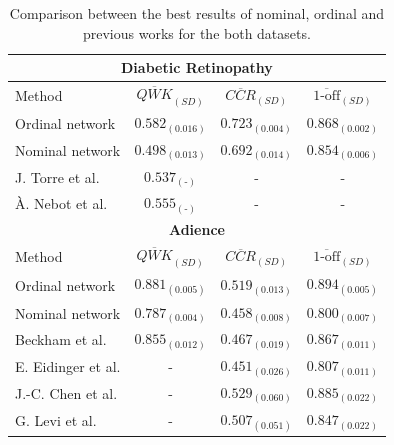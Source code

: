 \documentclass[journal]{IEEEtran}
\begin{document}
	\begin{table}[!t]
		\caption{Comparison between the best results of nominal, ordinal and previous works for the both datasets.}
		\label{table:Comparison}
		\scriptsize
		\centering
		\def\arraystretch{1.3}
		\begin{tabular}{lccc}
			\hline\hline
			\multicolumn{4}{c}{\textbf{Diabetic Retinopathy}}\\
			\hline
			Method                                    & $\overline{QWK}_{(SD)}$ & $\overline{CCR}_{(SD)}$ & $\overline{\text{1-off}}_{(SD)}$ \\ \hline
			Ordinal network                           &    $0.582_{(0.016)}$    &    $0.723_{(0.004)}$    &        $0.868_{(0.002)}$         \\
			Nominal network                           &    $0.498_{(0.013)}$    &    $0.692_{(0.014)}$    &        $0.854_{(0.006)}$         \\
			J. Torre et al. \cite{de2018weighted}     &  $0.537_{(\text{-})}$   &            -            &                -                 \\
			À. Nebot et al. \cite{nebot2016diabetic}  &  $0.555_{(\text{-})}$   &            -            &                -                 \\
			\hline
			\multicolumn{4}{c}{\textbf{Adience}}\\
			\hline
			Method                                    & $\overline{QWK}_{(SD)}$ & $\overline{CCR}_{(SD)}$ & $\overline{\text{1-off}}_{(SD)}$ \\ \hline
			Ordinal network                           &    $0.881_{(0.005)}$    &    $0.519_{(0.013)}$    &        $0.894_{(0.005)}$         \\
			Nominal network                           &    $0.787_{(0.004)}$    &    $0.458_{(0.008)}$    &        $0.800_{(0.007)}$         \\
			Beckham et al. \cite{beckham2017unimodal} &    $0.855_{(0.012)}$    &    $0.467_{(0.019)}$    &        $0.867_{(0.011)}$         \\
			E. Eidinger et al. \cite{eidinger2014age} &            -            &    $0.451_{(0.026)}$    &        $0.807_{(0.011)}$         \\
			J.-C. Chen et al. \cite{chen2016cascaded} &            -            &    $0.529_{(0.060)}$    &        $0.885_{(0.022)}$         \\
			G. Levi et al. \cite{levi2015age}         &            -            &    $0.507_{(0.051)}$    &        $0.847_{(0.022)}$         \\ \hline\hline
		\end{tabular}
	\end{table}
	
\end{document}
